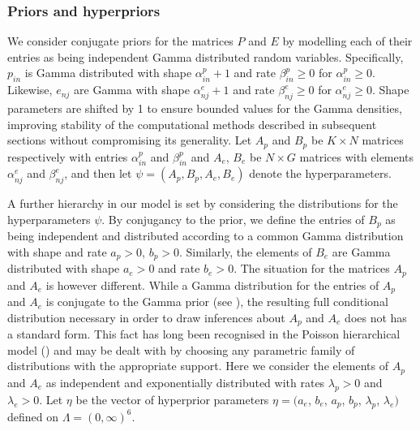\documentclass{bioinfo}
\begin{document}
\subsubsection{Priors and hyperpriors} 
We consider conjugate priors for the matrices $P$ and $E$ by modelling
each of their entries as being independent Gamma distributed random
variables. Specifically, $p_{in}$ is Gamma distributed with shape
$\alpha_{in}^p + 1$ and rate $\beta_{in}^p \geqslant 0$ for
$\alpha_{in}^p \geqslant 0$. Likewise, $e_{nj}$ are Gamma with shape
$\alpha_{nj}^e+1$ and rate $\beta_{nj}^e \geqslant 0$ for
$\alpha_{nj}^e \geqslant 0$. Shape parameters are shifted by 1 to
ensure bounded values for the Gamma densities, improving stability of
the computational methods described in subsequent sections without
compromising its generality. Let $A_p$ and $B_p$ be $K\times N$
matrices respectively with entries $\alpha_{in}^p$ and $\beta_{in}^p$
and $A_e$, $B_e$ be $N\times G$ matrices with elements $\alpha_{nj}^e$
and $\beta_{nj}^e$, and then let $\psi = (A_p, B_p, A_e, B_e)$ denote
the hyperparameters.


A further hierarchy in our model is set by considering the
distributions for the hyperparameters $\psi$. By conjugancy to the
prior, we define the entries of $B_p$ as being independent and
distributed according to a common Gamma distribution with shape and
rate $a_p > 0$, $b_p > 0$. Similarly, the elements of $B_e$ are Gamma
distributed with shape $a_e>0$ and rate $b_e>0$. The situation for the
matrices $A_p$ and $A_e$ is however different. While a Gamma
distribution for the entries of $A_p$ and $A_e$ is conjugate to the
Gamma prior (see \citealp{M}), the resulting full conditional
distribution necessary in order to draw inferences about $A_p$ and
$A_e$ does not has a standard form.  This fact has long been
recognised in the Poisson hierarchical model (\citealp{GMS93}) and may
be dealt with by choosing any parametric family of distributions with
the appropriate support. Here we consider the elements of $A_p$ and
$A_e$ as independent and exponentially distributed with rates
$\lambda_p > 0$ and $\lambda_e > 0$.  Let $\eta$ be the vector of
hyperprior parameters $\eta = (a_e$, $b_e$, $a_p$, $b_p$, $\lambda_p$,
$\lambda_e)$ defined on $\Lambda = (0, \infty)^6$.
\end{document}
